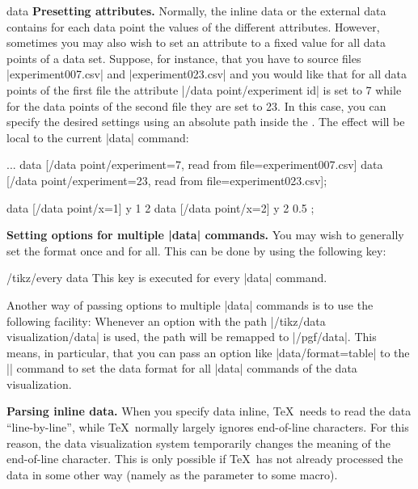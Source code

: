 \begin{datavisualizationoperation}{data}{}
    \medskip
    \textbf{Presetting attributes.}
    Normally, the inline data or the external data contains for each data point
    the values of the different attributes. However, sometimes you may also
    wish to set an attribute to a fixed value for all data points of a data
    set. Suppose, for instance, that you have to source files
    |experiment007.csv| and |experiment023.csv| and you would like that for all
    data points of the first file the attribute |/data point/experiment id| is
    set to 7 while for the data points of the second file they are set to 23.
    In this case, you can specify the desired settings using an absolute path
    inside the . The effect will be local to the current |data|
    command:
\begin{codeexample}
\datavisualization...
  data [/data point/experiment=7,  read from file=experiment007.csv]
  data [/data point/experiment=23, read from file=experiment023.csv];
\end{codeexample}

\begin{codeexample}[preamble={\usetikzlibrary{datavisualization}}]
\tikz
    data [/data point/x=1] {
      y
      1
      2
    }
    data [/data point/x=2] {
      y
      2
      0.5
    };
\end{codeexample}


    \medskip
    \textbf{Setting options for multiple |data| commands.}
    You may wish to generally set the format once and for all. This can be done
    by using the following key:
    \begin{stylekey}{/tikz/every data}
        This key is executed for every |data| command.
    \end{stylekey}

    Another way of passing options to multiple |data| commands is to use the
    following facility: Whenever an option with the path
    |/tikz/data visualization/data| is used, the path will be remapped to
    |/pgf/data|. This means, in particular, that you can pass an option like
    |data/format=table| to the |\datavisualization| command to set the data
    format for all |data| commands of the data visualization.


    \medskip
    \textbf{Parsing inline data.}
    When you specify data inline, \TeX\ needs to read the data
    ``line-by-line'', while \TeX\ normally largely ignores end-of-line
    characters. For this reason, the data visualization system temporarily
    changes the meaning of the end-of-line character. This is only possible if
    \TeX\ has not already processed the data in some other way (namely as the
    parameter to some macro).


\end{datavisualizationoperation}
